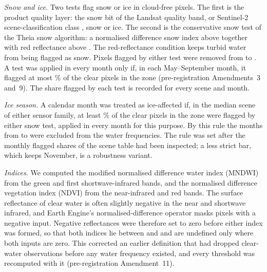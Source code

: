 \emph{Snow and ice.} Two tests flag snow or ice in cloud-free pixels. The first is the product quality layer: the snow bit of the Landsat quality band\citep{usgs_l45tm_c2l2,usgs_l7etm_c2l2,usgs_l89oli_c2l2}, or Sentinel-2 scene-classification class , snow or ice\citep{ee_s2_sr_harmonized}. The second is the conservative snow test of the Theia snow algorithm\citep{gascoin2019}: a normalised difference snow index above  together with red reflectance above . The red-reflectance condition keeps turbid water from being flagged as snow. Pixels flagged by either test were removed from  to . A test was applied in every month only if, in each May--September month, it flagged at most \% of the clear pixels in the zone (pre-registration Amendments~3 and~9). The share flagged by each test is recorded for every scene and month.

\emph{Ice season.} A calendar month was treated as ice-affected if, in the median scene of either sensor family, at least \% of the clear pixels in the zone were flagged by either snow test, applied in every month for this purpose. By this rule the months from  to  were excluded from the water frequencies. The rule was set after the monthly flagged shares of the scene table had been inspected; a less strict bar, which keeps November, is a robustness variant.

\emph{Indices.} We computed the modified normalised difference water index (MNDWI) from the green and first shortwave-infrared bands\citep{xu2006}, and the normalised difference vegetation index (NDVI) from the near-infrared and red bands. The surface reflectance of clear water is often slightly negative in the near and shortwave infrared, and Earth Engine's normalised-difference operator masks pixels with a negative input\citep{ee_normalizeddifference}. Negative reflectances were therefore set to zero before either index was formed, so that both indices lie between  and  and are undefined only where both inputs are zero. This corrected an earlier definition that had dropped clear-water observations before any water frequency existed, and every threshold was recomputed with it (pre-registration Amendment~11).

